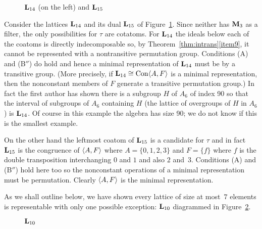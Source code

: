 \begin{figure}[htb]
\begin{center}
  \begin{tikzpicture}[scale=1]
    
  \end{tikzpicture}
  \hskip15mm
  \begin{tikzpicture}[scale=1]
    
  \end{tikzpicture}
\end{center}
\caption{$\bL_{14}$ (on the left) and $\bL_{15}$}\label{fig:L14and15}
\end{figure}


Consider the lattices $\bL_{14}$ and its dual $\bL_{15}$ 
of Figure~\ref{fig:L14and15}. Since neither
has $\bM_3$ as a filter, the only possibilities for $\tau$ are cotatoms. 
For $\bL_{14}$ the ideals below each of the coatoms is directly 
indecomposable so, by Theorem~\ref{thm:intrans}\eqref{item9}, 
it cannot be represented with a nontransitive permutation group. Conditions
(A) and (B$''$) do hold and hence a minimal representation of 
$\bL_{14}$ must be by a transitive group. (More precisely, if
$\bL_{14} \cong \Con \<A,F\>$ is a minimal representation, 
then the nonconstant members of $F$ generate 
a transitive permutation group.) In fact the first author 
has shown there is a 
subgroup $H$ of $A_6$ of index 90 so that the interval of subgroups of
$A_6$ containing $H$ (the lattice of overgroups of $H$ in $A_6$) is $\bL_{14}$.
Of course in this example the algebra has size 90; we do not
know if this is the smallest example.

On the other hand the leftmost coatom of $\bL_{15}$ is a candidate for 
$\tau$ and in fact $\bL_{15}$ is the congruence of
$\<A,F\>$ where $A = \{0,1,2,3\}$ and $F = \{f\}$ where $f$ is the double
transposition interchanging $0$ and $1$ and also $2$ and~$3$. 
Conditions (A) and (B$''$) hold here too so the nonconstant operations of a 
minimal representation must be permutation. Clearly $\<A,F\>$ is the minimal
representation.

As we shall outline below, we have shown every lattice of size at most~$7$
elements
is representable with only one possible exception: $\bL_{10}$ diagrammed 
in Figure~\ref{fig:L10}.

\begin{figure}[htb]
\begin{center}
  \begin{tikzpicture}[scale=1]
    
  \end{tikzpicture}
\end{center}
\caption{$\bL_{10}$}\label{fig:L10}
\end{figure}

